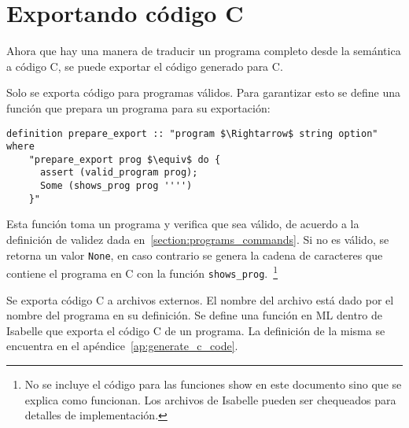 \begin{comment}
  intptr_t n;
  intptr_t r;

  intptr_t fact(intptr_t n) {
    intptr_t r;
    intptr_t i;
    r = (1);
    i = (1);
    while ((i) < ((n) + (1))) {
      r = ((r) * (i));
      i = ((i) + (1));
    }
    return(r);
  }

  intptr_t main() {
    n = (5);
    (r) = (fact(n));
  }
\end{lstlisting}
\caption{Programa traducido a C}
\label{fig:factorial_c}
\end{figure}

\end{comment}

\section{Exportando código C}\label{section:exporting_c_code}

Ahora que hay una manera de traducir un programa completo desde la semántica a código C, se puede exportar el código generado para C.

Solo se exporta código para programas válidos.
Para garantizar esto se define una función que prepara un programa para su exportación:

\begin{lstlisting}[mathescape=true]
  definition prepare_export :: "program $\Rightarrow$ string option" where
    "prepare_export prog $\equiv$ do {
      assert (valid_program prog);
      Some (shows_prog prog '''')
    }"
\end{lstlisting}


Esta función toma un programa y verifica que sea válido, de acuerdo a la definición de validez dada en~\ref{section:programs_commands}.
Si no es válido, se retorna un valor \verb|None|, en caso contrario se genera la cadena de caracteres que contiene el programa en C con la función \verb|shows_prog|.~\footnote{No se incluye el código para las funciones show en este documento sino que se explica como funcionan. Los archivos de Isabelle pueden ser chequeados para detalles de implementación.}

Se exporta código C a archivos externos.
El nombre del archivo está dado por el nombre del programa en su definición.
Se define una función en ML dentro de Isabelle que exporta el código C de un programa.
La definición de la misma se encuentra en el apéndice~\ref{ap:generate_c_code}.



